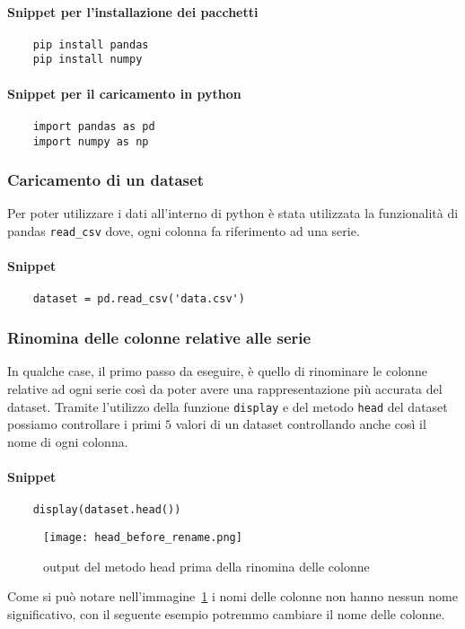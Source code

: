 \paragraph{Snippet per l'installazione dei pacchetti}
\begin{verbatim}
    pip install pandas
    pip install numpy
\end{verbatim}
\paragraph{Snippet per il caricamento in python}
\begin{verbatim}
    import pandas as pd
    import numpy as np
\end{verbatim}



\subsubsection{Caricamento di un dataset}
Per poter utilizzare i dati all'interno di python è stata utilizzata
la funzionalità di pandas \texttt{read\_csv} dove, ogni colonna fa riferimento 
ad una serie.
\paragraph{Snippet}
\begin{verbatim}
    dataset = pd.read_csv('data.csv')
\end{verbatim}





\subsubsection{Rinomina delle colonne relative alle serie}
In qualche case, il primo passo da eseguire, è quello di rinominare
le colonne relative ad ogni serie così da poter avere una rappresentazione
più accurata del dataset.
Tramite l'utilizzo della funzione \texttt{display} e del metodo \texttt{head}
del dataset possiamo controllare i primi $5$ valori di un dataset
controllando anche così il nome di ogni colonna.
\paragraph{Snippet}
\begin{verbatim}
    display(dataset.head())
\end{verbatim}
\begin{figure}[h!]
    \texttt{[image: head\_before\_rename.png]}
    \caption{output del metodo head prima della rinomina delle colonne}
    \label{fig:head_before_rename}
\end{figure}
Come si può notare nell'immagine~\ref*{fig:head_before_rename} i nomi delle colonne 
non hanno nessun nome significativo, con il seguente esempio potremmo
cambiare il nome delle colonne.

